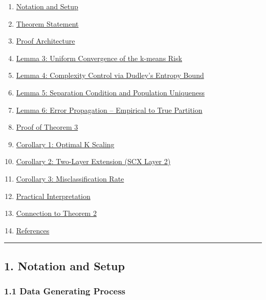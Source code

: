 \documentclass[
  12pt,
]{article}
\providecommand{\tightlist}{%
  \setlength{\itemsep}{0pt}\setlength{\parskip}{0pt}}
\begin{document}
\begin{enumerate}
\def\labelenumi{\arabic{enumi}.}
\tightlist
\item
  \hyperref[1-notation-and-setup]{Notation and Setup}
\item
  \hyperref[2-theorem-statement]{Theorem Statement}
\item
  \hyperref[3-proof-architecture]{Proof Architecture}
\item
  \hyperref[4-lemma-3-uniform-convergence-of-the-k-means-risk]{Lemma 3:
  Uniform Convergence of the k-means Risk}
\item
  \hyperref[5-lemma-4-complexity-control-via-dudleys-entropy-bound]{Lemma
  4: Complexity Control via Dudley's Entropy Bound}
\item
  \hyperref[6-lemma-5-separation-condition-and-population-uniqueness]{Lemma
  5: Separation Condition and Population Uniqueness}
\item
  \hyperref[7-lemma-6-error-propagation----empirical-to-true-partition]{Lemma
  6: Error Propagation -- Empirical to True Partition}
\item
  \hyperref[8-proof-of-theorem-3]{Proof of Theorem 3}
\item
  \hyperref[9-corollary-1-optimal-k-scaling]{Corollary 1: Optimal K
  Scaling}
\item
  \hyperref[10-corollary-2-two-layer-extension-scx-layer-2]{Corollary 2:
  Two-Layer Extension (SCX Layer 2)}
\item
  \hyperref[11-corollary-3-misclassification-rate]{Corollary 3:
  Misclassification Rate}
\item
  \hyperref[12-practical-interpretation]{Practical Interpretation}
\item
  \hyperref[13-connection-to-theorem-2]{Connection to Theorem 2}
\item
  \hyperref[14-references]{References}
\end{enumerate}

\begin{center}\rule{0.5\linewidth}{0.5pt}\end{center}

\subsection{1. Notation and Setup}\label{notation-and-setup}

\subsubsection{1.1 Data Generating
Process}\label{data-generating-process}
\end{document}
